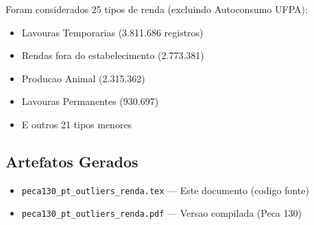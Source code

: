 \documentclass[11pt,a4paper]{article}
\begin{document}
Foram considerados 25 tipos de renda (excluindo Autoconsumo UFPA):

\begin{itemize}[noitemsep]
    \item Lavouras Temporarias (3.811.686 registros)
    \item Rendas fora do estabelecimento (2.773.381)
    \item Producao Animal (2.315.362)
    \item Lavouras Permanentes (930.697)
    \item E outros 21 tipos menores
\end{itemize}

\subsection{Artefatos Gerados}

\begin{itemize}
    \item \texttt{peca130\_pt\_outliers\_renda.tex} --- Este documento (codigo fonte)
    \item \texttt{peca130\_pt\_outliers\_renda.pdf} --- Versao compilada (Peca 130)
\end{itemize}
\end{document}
